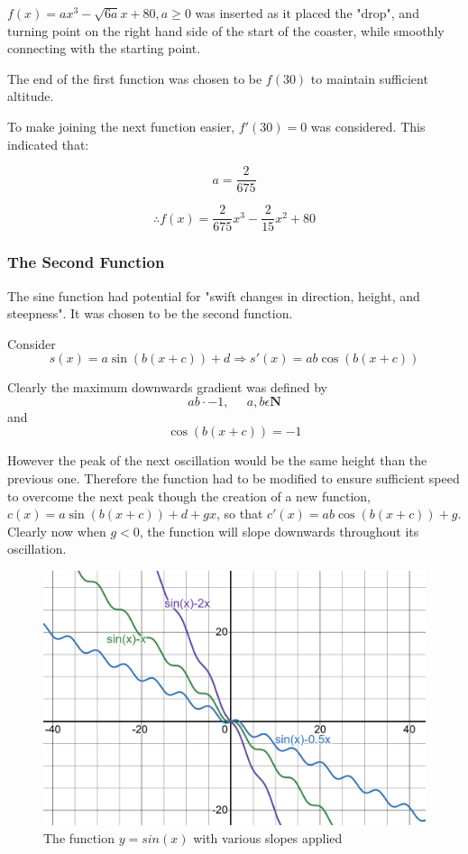 \documentclass[11pt, letterpaper]{article}
\begin{document}
$f(x)=ax^3-\sqrt{6a}x+80, a\geq0$ was inserted as it placed the "drop", and turning point on the right hand side of the start of the coaster, while smoothly connecting with the starting point. 


	


The end of the first function was chosen to be $f(30)$ to maintain sufficient altitude.

To make joining the next function easier, $f'(30)=0$ was considered. This indicated that:

$$a=\frac{2}{675}$$

$$\therefore f(x)=\frac{2}{675}x^{3}-\frac{2}{15}x^{2}+80$$


\subsubsection{The Second Function}
The sine function had potential for "swift changes in direction, height, and steepness". It was chosen to be the second function.

Consider $$s(x)=a\sin(b(x+c))+d \Rightarrow s'(x)=ab\cos(b(x+c))$$

Clearly the maximum downwards gradient was defined by $$ab\cdot-1,\;\;\;\;\; a,b \epsilon \mathbf{N}$$
and 
$$\cos(b(x+c))=-1$$

However the peak of the next oscillation would be the same height than the previous one. Therefore the function  had to be modified to ensure sufficient speed to overcome the next peak though the creation of a new function, $c(x)=a\sin(b(x+c))+d+gx$, so that $c'(x)=ab\cos(b(x+c))+g$. Clearly now when $g<0$, the function will slope downwards throughout its oscillation. 

	\begin{figure}[h!]
		\centering
		\includegraphics[width=15cm]{c(x).png}
		\caption{The function $y=sin(x)$ with various slopes applied}
	\end{figure}
	\pagebreak
\end{document}
